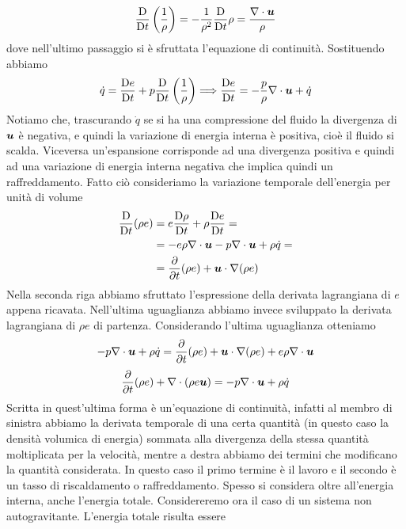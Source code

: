 \begin{align*}
\frac{\DD}{\DD t} \left( \frac{1}{\rho}\right) = - \frac{1}{\rho^2}\frac{\DD}{\DD t} \rho = \frac{\Div{u}}{\rho}
\end{align*}
dove nell'ultimo passaggio si è sfruttata l'equazione di continuità.
Sostituendo abbiamo 
\begin{align*}
\dot{q} = \frac{\DD e}{\DD t} + p \frac{\DD}{\DD t} \left( \frac{1}{\rho}\right)  \Longrightarrow\frac{\DD e}{\DD t} = - \frac{p}{\rho}\Div{u} + \dot{q}
\end{align*}
Notiamo che, trascurando $\dot{q}$ se si ha una compressione del fluido la divergenza di $\V{u}$ è negativa, e quindi la variazione di energia interna è positiva, cioè il fluido si scalda. Viceversa un'espansione corrisponde ad una divergenza positiva e quindi ad una variazione di energia interna negativa che implica quindi un raffreddamento. Fatto ciò consideriamo la variazione temporale dell'energia per unità di volume
\begin{align*}
\frac{\DD}{\DD t}(\rho e) & = e \frac{\DD \rho}{\DD t} + \rho \frac{\DD e}{\DD t} = \\
& = -e\rho \V{\nabla}\cdot \V{u} -p \V{\nabla}\cdot \V{u} + \rho \dot{q} = \\
& = \frac{\partial}{\partial t}(\rho e) + \V{u}\cdot \V{\nabla} (\rho e) 
\end{align*}
Nella seconda riga abbiamo sfruttato l'espressione della derivata lagrangiana di $e$ appena ricavata. Nell'ultima uguaglianza abbiamo invece sviluppato la derivata lagrangiana di $\rho e$ di partenza. Considerando l'ultima uguaglianza otteniamo
\begin{align*}
-p \V{\nabla}\cdot \V{u} + \rho \dot{q} = \frac{\partial}{\partial t}(\rho e) + \V{u}\cdot \V{\nabla} (\rho e) + e\rho \V{\nabla}\cdot \V{u}
\end{align*}
\begin{equation}
\frac{\partial}{\partial t}(\rho e) + \V{\nabla} \cdot (\rho e \V{u})  = -p\V{\nabla}\cdot \V{u} + \rho \dot{q}
\end{equation}
Scritta in quest'ultima forma è un'equazione di continuità, infatti al membro di sinistra abbiamo la derivata temporale di una certa quantità (in questo caso la densità volumica di energia) sommata alla divergenza della stessa quantità moltiplicata per la velocità, mentre a destra abbiamo dei termini che modificano la quantità considerata. In questo caso il primo termine è il lavoro e il secondo è un tasso di riscaldamento o raffreddamento.
Spesso si considera oltre all'energia interna, anche l'energia totale. Considereremo ora il caso di un sistema non autogravitante. L'energia totale risulta essere
